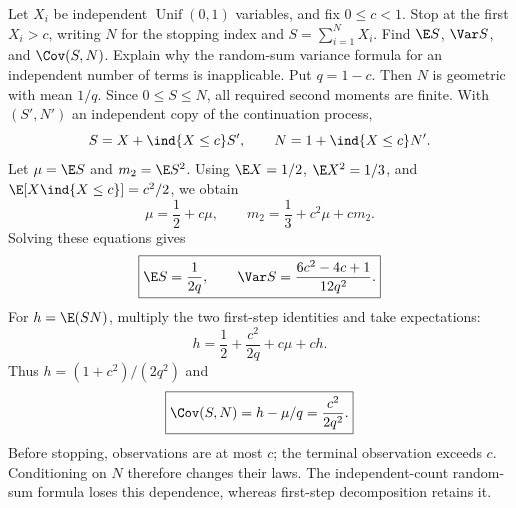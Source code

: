 Let $X_i$ be independent $\operatorname{Unif}(0,1)$ variables, and fix $0\le c<1$. Stop at the first $X_i>c$, writing $N$ for the stopping index and $S=\sum_{i=1}^NX_i$. Find $\E S$, $\Var S$, and $\Cov(S,N)$. Explain why the random-sum variance formula for an independent number of terms is inapplicable.
\solution Put $q=1-c$. Then $N$ is geometric with mean $1/q$. Since $0\le S\le N$, all required second moments are finite. With $(S',N')$ an independent copy of the continuation process,
\[
S=X+\ind\{X\le c\}S',\qquad
N=1+\ind\{X\le c\}N'.
\]
Let $\mu=\E S$ and $m_2=\E S^2$. Using $\E X=1/2$, $\E X^2=1/3$, and $\E[X\ind\{X\le c\}]=c^2/2$, we obtain
\[
\mu=\frac12+c\mu,\qquad
m_2=\frac13+c^2\mu+cm_2.
\]
Solving these equations gives
\[
\boxed{\E S=\frac1{2q},\qquad
\Var S=\frac{6c^2-4c+1}{12q^2}.}
\]
For $h=\E(SN)$, multiply the two first-step identities and take expectations:
\[
h=\frac12+\frac{c^2}{2q}+c\mu+ch.
\]
Thus $h=(1+c^2)/(2q^2)$ and
\[
\boxed{\Cov(S,N)=h-\mu/q=\frac{c^2}{2q^2}.}
\]
\pitfall Before stopping, observations are at most $c$; the terminal observation exceeds $c$. Conditioning on $N$ therefore changes their laws. The independent-count random-sum formula loses this dependence, whereas first-step decomposition retains it.
